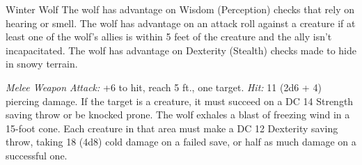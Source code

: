 \documentclass[10pt,a4paper,twoside,twocolumn,openany,bg=print,nodeprecatedcode]{dndbook}
\begin{document}
\begin{DndMonster}[float*=t]{Winter Wolf}
\DndMonsterBasics[
armor-class = {13 (natural armor)},
hit-points = {\DndDice{10d10 + 20}},
speed = {50 ft.}
]
\DndMonsterAbilityScores[
 str = 18,
 dex = 13,
 con = 14,
 int = 7,
 wis = 12,
 cha = 8
]
\DndMonsterDetails[
skills = {Perception +5, Stealth +3},
damage-immunities = {cold},
languages = {Common, Giant, Winter Wolf},
challenge = 3,
]
The wolf has advantage on Wisdom (Perception) checks that rely on hearing or smell.
The wolf has advantage on an attack roll against a creature if at least one of the wolf's allies is within 5 feet of the creature and the ally isn't incapacitated.
The wolf has advantage on Dexterity (Stealth) checks made to hide in snowy terrain.
\par
{}
\textsl{Melee Weapon Attack:} +6 to hit, reach 5 ft., one target. \textsl{Hit:} 11 (2d6 + 4) piercing damage. If the target is a creature, it must succeed on a DC 14 Strength saving throw or be knocked prone.
The wolf exhales a blast of freezing wind in a 15-foot cone. Each creature in that area must make a DC 12 Dexterity saving throw, taking 18 (4d8) cold damage on a failed save, or half as much damage on a successful one.
\end{DndMonster}


\clearpage
\end{document}
